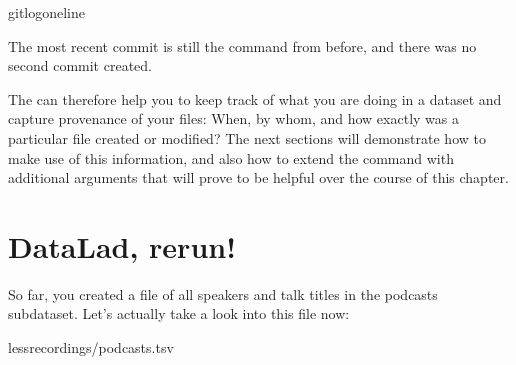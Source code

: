 %
\begin{sphinxVerbatim}[commandchars=\\\{\}]
gitlog\PYGZhy{}\PYGZhy{}oneline
\end{sphinxVerbatim}
\sphinxresetverbatimhllines

\sphinxAtStartPar
The most recent commit is still the  command from before,
and there was no second  commit created.

\sphinxAtStartPar
The  can therefore help you to keep track of what you are doing
in a dataset and capture provenance of your files: When, by whom, and how exactly
was a particular file created or modified?
The next sections will demonstrate how to make use of this information,
and also how to extend the command with additional arguments that will prove to
be helpful over the course of this chapter.

\sphinxstepscope

\ignorespaces 

\section{DataLad, rerun!}
\label{\detokenize{basics/101-109-rerun:datalad-rerun}}\label{\detokenize{basics/101-109-rerun:run2}}\label{\detokenize{basics/101-109-rerun:index-0}}\label{\detokenize{basics/101-109-rerun::doc}}
\sphinxAtStartPar
So far, you created a  file of all
speakers and talk titles in the  podcasts subdataset.
Let’s actually take a look into this file now:

\begin{sphinxVerbatim}[commandchars=\\\{\}]
lessrecordings/podcasts.tsv
\end{sphinxVerbatim}

